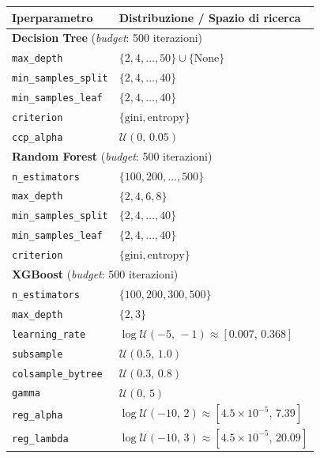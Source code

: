 \begin{table}[htbp]
    \centering
    \footnotesize
    \renewcommand{\arraystretch}{0.95}
    \begin{tabular}{ll}
        \toprule
        \textbf{Iperparametro} & \textbf{Distribuzione / Spazio di ricerca} \\
        \midrule
        \multicolumn{2}{l}{\textbf{Decision Tree} (\textit{budget}: 500 iterazioni)} \\
        \midrule
        \texttt{max\_depth} & $\{2, 4, \dots, 50\} \cup \{\text{None}\}$ \\
        \texttt{min\_samples\_split} & $\{2, 4, \dots, 40\}$ \\
        \texttt{min\_samples\_leaf} & $\{2, 4, \dots, 40\}$ \\
        \texttt{criterion} & $\{\text{gini}, \text{entropy}\}$ \\
        \texttt{ccp\_alpha} & $\mathcal{U}(0,\, 0.05)$ \\
        \midrule
        \multicolumn{2}{l}{\textbf{Random Forest} (\textit{budget}: 500 iterazioni)} \\
        \midrule
        \texttt{n\_estimators} & $\{100, 200, \dots, 500\}$ \\
        \texttt{max\_depth} & $\{2, 4, 6, 8\}$ \\
        \texttt{min\_samples\_split} & $\{2, 4, \dots, 40\}$ \\
        \texttt{min\_samples\_leaf} & $\{2, 4, \dots, 40\}$ \\
        \texttt{criterion} & $\{\text{gini}, \text{entropy}\}$ \\
        \midrule
        \multicolumn{2}{l}{\textbf{XGBoost} (\textit{budget}: 500 iterazioni)} \\
        \midrule
        \texttt{n\_estimators} & $\{100, 200, 300, 500\}$ \\
        \texttt{max\_depth} & $\{2, 3\}$ \\
        \texttt{learning\_rate} & $\log\mathcal{U}(-5,\, -1) \approx [0.007,\, 0.368]$ \\
        \texttt{subsample} & $\mathcal{U}(0.5,\, 1.0)$ \\
        \texttt{colsample\_bytree} & $\mathcal{U}(0.3,\, 0.8)$ \\
        \texttt{gamma} & $\mathcal{U}(0,\, 5)$ \\
        \texttt{reg\_alpha} & $\log\mathcal{U}(-10,\, 2) \approx [4.5\times 10^{-5},\, 7.39]$ \\
        \texttt{reg\_lambda} & $\log\mathcal{U}(-10,\, 3) \approx [4.5\times 10^{-5},\, 20.09]$ \\

\end{tabular}
\end{table}
